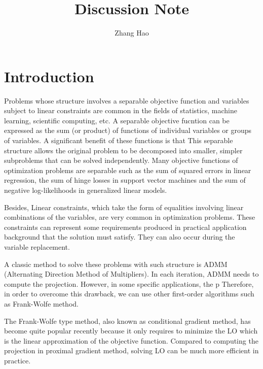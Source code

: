 \documentclass{article}
\title{Discussion Note}
\author{Zhang Hao}
\numberwithin{equation}{section}
\begin{document}
\maketitle


\section{Introduction }
Problems whose structure involves a separable objective function and variables subject to linear constraints are
common in the fields of statistics, machine learning, scientific computing, etc. 
A separable objective fucntion can be expressed as the sum (or product) of functions of individual variables 
or groups of variables. A significant benefit of these functions is that 
This separable structure allows the original problem to be decomposed into smaller, simpler subproblems that can be solved independently. 
Many objective functions of optimization problems are separable such as the sum of squared errors in linear regression, 
the sum of hinge losses in support vector machines and the sum of negative log-likelihoods in generalized linear models.

Besides, Linear constraints, which take the form of equalities involving linear combinations of the variables, 
are very common in optimization problems.
These constraints can represent some requirements produced in practical application background that the solution must satisfy. 
They can also occur during the variable replacement. 

A classic method to solve these problems with such structure is ADMM (Alternating Direction Method of Multipliers). 
In each iteration, ADMM needs to compute the projection. 
However, in some specific applications, the p
Therefore, in order to overcome this drawback, we can use other first-order
algorithms such as Frank-Wolfe method.

The Frank-Wolfe type method, also known as conditional gradient method, has become quite popular recently because it only requires to minimize the LO which is the linear approximation of the
objective function. Compared to computing the projection in proximal gradient method, solving LO can be much more
efficient in practice.
\end{document}
